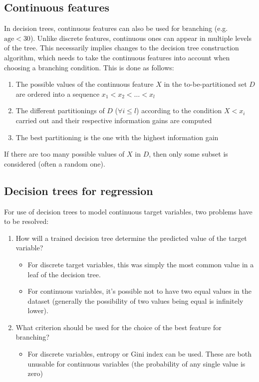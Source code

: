 \documentclass[a4paper]{article}
\begin{document}
	\subsection{Continuous features}
	In decision trees, continuous features can also be used for branching (e.g. $\text{age} < 30$).
	Unlike discrete features, continuous ones can appear in multiple levels of the tree.
	This necessarily implies changes to the decision tree construction algorithm, which
	needs to take the continuous features into account when choosing a branching condition.
	This is done as follows:
	\begin{enumerate}
		\item The possible values of the continuous feature $X$ in the to-be-partitioned set $D$
			are ordered into a sequence $x_1 < x_2 < \dots < x_l$
		\item The different partitionings of $D$ ($\forall i \le l$) according to
			the condition $X < x_i$ carried out and their respective information
			gains are computed
		\item The best partitioning is the one with the highest information gain
	\end{enumerate}

	If there are too many possible values of $X$ in $D$, then only some subset is considered
	(often a random one).

	\subsection{Decision trees for regression}
	For use of decision trees to model continuous target variables, two problems have to be resolved:
	\begin{enumerate}
		\item How will a trained decision tree determine the predicted value of the target variable?
			\begin{itemize}
				\item For discrete target variables, this was simply the most common value in a leaf
					of the decision tree.
				\item For continuous variables, it's possible not to have
					two equal values in the dataset (generally the possibility
					of two values being equal is infinitely lower).
			\end{itemize}
		\item What criterion should be used for the choice of the best feature for branching?
			\begin{itemize}
				\item For discrete variables, entropy or Gini index can be used.
					These are both unusable for continuous variables
					(the probability of any single value is zero)
			\end{itemize}
	\end{enumerate}
\end{document}

